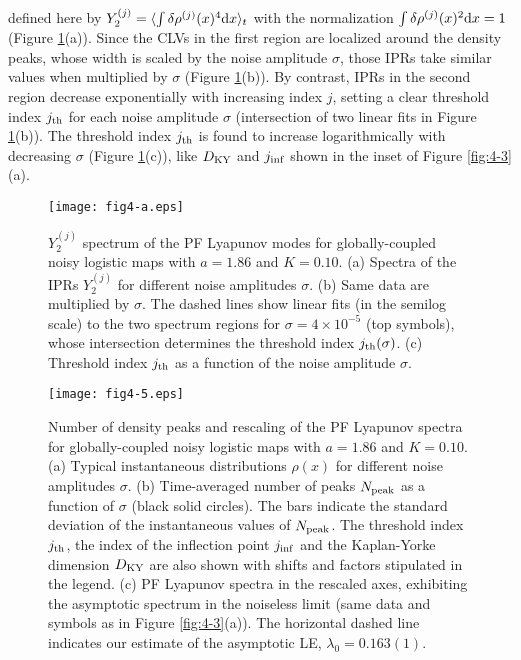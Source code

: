 \documentclass[12pt]{iopart}
\begin{document}
 defined here by $Y_2^{(j)} = \langle \int \delta\rho^{(j)}(x)^4 \mathrm{d} x \rangle_t$
 with the normalization $\int \delta\rho^{(j)}(x)^2 \mathrm{d} x = 1$
 (Figure \ref{fig:4-a}(a)).
Since the CLVs in the first region are localized around the density peaks,
 whose width is scaled by the noise amplitude $\sigma$,
 those IPRs take similar values
 when multiplied by $\sigma$ (Figure \ref{fig:4-a}(b)).
By contrast, IPRs in the second region
 decrease exponentially with increasing index $j$,
 setting a clear threshold index $j_{\rm th}$
 for each noise amplitude $\sigma$
 (intersection of two linear fits in Figure \ref{fig:4-a}(b)).
The threshold index $j_{\rm th}$ is found to increase
 logarithmically with decreasing $\sigma$ (Figure \ref{fig:4-a}(c)),
 like $D_{\rm KY}$ and $j_{\rm inf}$
 shown in the inset of Figure \ref{fig:4-3}(a).

\begin{figure}[t]
 \begin{center}
  \texttt{[image: fig4-a.eps]}
  \caption{$Y_2^{(j)}$ spectrum of the PF Lyapunov modes for globally-coupled noisy logistic maps  with $a=1.86$ and $K=0.10$. (a) Spectra of the IPRs $Y_2^{(j)}$ for different noise amplitudes $\sigma$. (b) Same data are multiplied by $\sigma$. The dashed lines show linear fits (in the semilog scale) to the two spectrum regions for $\sigma = 4 \times 10^{-5}$ (top symbols), whose intersection determines the threshold index $j_{\rm th}(\sigma)$. (c) Threshold index $j_{\rm th}$ as a function of the noise amplitude $\sigma$.}%
  \label{fig:4-a}
 \end{center}
\end{figure}%

\begin{figure}[t]
 \begin{center}
  \texttt{[image: fig4-5.eps]}
  \caption{Number of density peaks and rescaling of the PF Lyapunov spectra for globally-coupled noisy logistic maps  with $a=1.86$ and $K=0.10$. (a) Typical instantaneous distributions $\rho(x)$ for different noise amplitudes $\sigma$. (b) Time-averaged number of peaks $N_{\rm peak}$ as a function of $\sigma$ (black solid circles). The bars indicate the standard deviation of the instantaneous values of $N_{\rm peak}$. The threshold index $j_{\rm th}$, the index of the inflection point $j_{\rm inf}$ and the Kaplan-Yorke dimension $D_{\rm KY}$ are also shown with shifts and factors stipulated in the legend. (c) PF Lyapunov spectra in the rescaled axes, exhibiting the asymptotic spectrum in the noiseless limit (same data and symbols as in Figure \ref{fig:4-3}(a)). The horizontal dashed line indicates our estimate of the asymptotic LE, $\lambda_0 = 0.163(1)$.
}
  \label{fig:4-5}
 \end{center}
\end{figure}%
\end{document}
